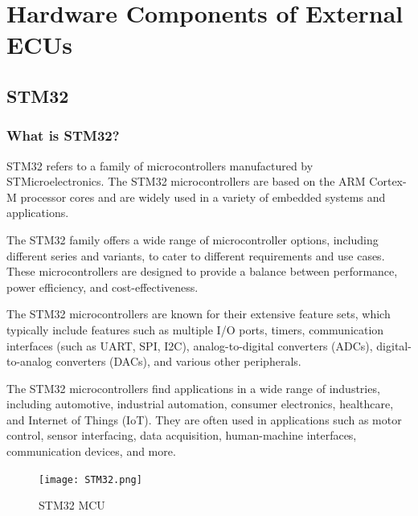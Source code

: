 \documentclass[
12pt,
oneside, 
onehalfspacing, 
nolistspacing, 
parskip, 
chapterinoneline, 
]{AASTCOMPUTER}
\begin{document}
\section{Hardware Components of External ECUs}
\subsection{STM32}
\subsubsection{What is STM32?}
STM32 refers to a family of microcontrollers manufactured by STMicroelectronics. The STM32 microcontrollers are based on the ARM Cortex-M processor cores and are widely used in a variety of embedded systems and applications.

The STM32 family offers a wide range of microcontroller options, including different series and variants, to cater to different requirements and use cases. These microcontrollers are designed to provide a balance between performance, power efficiency, and cost-effectiveness.

The STM32 microcontrollers are known for their extensive feature sets, which typically include features such as multiple I/O ports, timers, communication interfaces (such as UART, SPI, I2C), analog-to-digital converters (ADCs), digital-to-analog converters (DACs), and various other peripherals.

The STM32 microcontrollers find applications in a wide range of industries, including automotive, industrial automation, consumer electronics, healthcare, and Internet of Things (IoT). They are often used in applications such as motor control, sensor interfacing, data acquisition, human-machine interfaces, communication devices, and more.
\begin{figure}[!ht]
\centering
\texttt{[image: STM32.png]}
\caption[STM32]{STM32 MCU}
\label{fig:TCU}
\end{figure}
\end{document}
